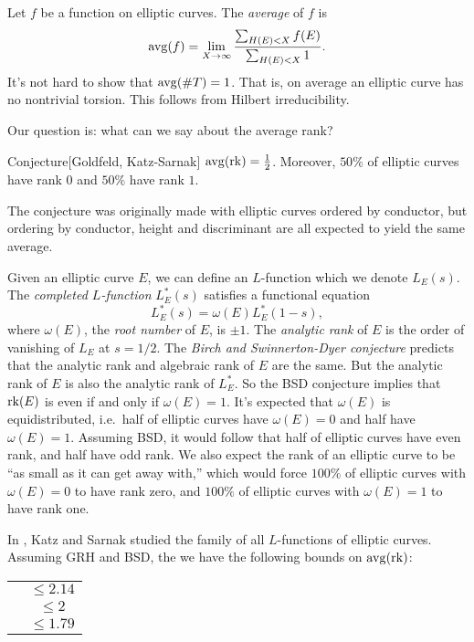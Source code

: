 Let $f$ be a function on elliptic curves. The \emph{average} of $f$ is 
\[
  \operatorname{avg}(f) = \lim_{X\to \infty} \frac{\sum_{H(E)<X} f(E)}{\sum_{H(E)<X} 1} .
\]
It's not hard to show that $\operatorname{avg}(\# T)=1$. That is, on average an elliptic 
curve has no nontrivial torsion. This follows from Hilbert irreducibility. 

Our question is: what can we say about the average rank? 

\begin{enonce}{Conjecture}[Goldfeld, Katz-Sarnak]
$\operatorname{avg}(\operatorname{rk}) = \frac 1 2$. Moreover, $50\%$ of elliptic curves have rank 
$0$ and $50\%$ have rank $1$. 
\end{enonce}

The conjecture was originally made with elliptic curves ordered by conductor, 
but ordering by conductor, height and discriminant are all expected to yield 
the same average. 

Given an elliptic curve $E$, we can define an $L$-function which we denote 
$L_E(s)$. The \emph{completed $L$-function} $L_E^\ast(s)$ satisfies a 
functional equation 
\[
  L_E^\ast(s) = \omega(E) L_E^\ast(1-s), 
\]
where $\omega(E)$, the \emph{root number} of $E$, is $\pm 1$. The 
\emph{analytic rank} of $E$ is the order of vanishing of $L_E$ at 
$s=1/2$. The \emph{Birch and Swinnerton-Dyer conjecture} predicts that the 
analytic rank and algebraic rank of $E$ are the same. But the analytic 
rank of $E$ is also the analytic rank of $L_E^\ast$. So the BSD conjecture 
implies that $\operatorname{rk}(E)$ is even if and only if $\omega(E)=1$. It's expected 
that $\omega(E)$ is equidistributed, i.e.~half of elliptic curves have 
$\omega(E)=0$ and half have $\omega(E)=1$. Assuming BSD, it would follow 
that half of elliptic curves have even rank, and half have odd rank. We also 
expect the rank of an elliptic curve to be ``as small as it can get away 
with,'' which would force $100\%$ of elliptic curves with $\omega(E)=0$ to 
have rank zero, and $100\%$ of elliptic curves with $\omega(E)=1$ to have rank 
one. 

In \cite{ks99}, Katz and Sarnak studied the family of all $L$-functions of 
elliptic curves. Assuming GRH and BSD, the we have the following bounds on 
$\operatorname{avg}(\operatorname{rk})$:
\begin{center}
\begin{tabular}{c|c}
\cite{b92} & $\leqslant 2.14$ \\
\cite{h04} & $\leqslant 2$ \\
\cite{y06} & $\leqslant 1.79$
\end{tabular}
\end{center}


